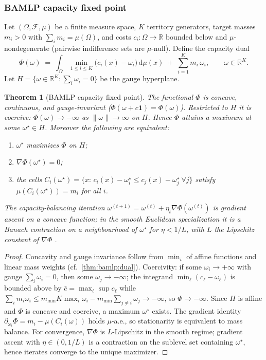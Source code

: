 \documentclass[11pt]{article}
\theoremstyle{plain}
\newtheorem{theorem}{Theorem}[section]
\theoremstyle{definition}
\theoremstyle{remark}
\newcommand{\dd}{\mathrm{d}}
\begin{document}
\subsubsection{BAMLP capacity fixed point}

Let $(\Omega,\mathcal{F},\mu)$ be a finite measure space, $K$ territory
generators, target masses $m_i>0$ with $\sum_i m_i=\mu(\Omega)$, and costs
$c_i:\Omega\to\mathbb{R}$ bounded below and $\mu$-nondegenerate (pairwise
indifference sets are $\mu$-null). Define the capacity dual
\begin{equation}
  \Phi(\omega)\;=\;\int_\Omega \min_{1\le i\le K}\bigl(c_i(x)-\omega_i\bigr)\,\dd\mu(x)
  \;+\;\sum_{i=1}^{K} m_i\,\omega_i,
  \qquad \omega\in\mathbb{R}^K.
  \label{eq:bamlp:phi}
\end{equation}
Let $H=\{\omega\in\mathbb{R}^K:\sum_i\omega_i=0\}$ be the gauge hyperplane.

\begin{theorem}[BAMLP capacity fixed point]\label{thm:bamlp:capacity-fp}
The functional $\Phi$ is concave, continuous, and gauge-invariant
($\Phi(\omega+c\mathbf{1})=\Phi(\omega)$). Restricted to $H$ it is coercive:
$\Phi(\omega)\to-\infty$ as $\|\omega\|\to\infty$ on $H$. Hence $\Phi$
attains a maximum at some $\omega^\star\in H$. Moreover the following are
equivalent:
\begin{enumerate}[label=\textup{(\roman*)}]
  \item $\omega^\star$ maximizes $\Phi$ on $H$;
  \item $\nabla\Phi(\omega^\star)=0$;
  \item the cells $C_i(\omega^\star)=\{x:\,c_i(x)-\omega^\star_i\le
    c_j(x)-\omega^\star_j\ \forall j\}$ satisfy $\mu(C_i(\omega^\star))=m_i$
    for all $i$.
\end{enumerate}
The capacity-balancing iteration $\omega^{(t+1)}=\omega^{(t)}+\eta_t\nabla\Phi
(\omega^{(t)})$ is gradient ascent on a concave function; in the smooth
Euclidean specialization it is a Banach contraction on a neighbourhood of
$\omega^\star$ for $\eta<1/L$, with $L$ the Lipschitz constant of $\nabla\Phi$
\cite{BAMLP:2026}.
\end{theorem}

\begin{proof}
Concavity and gauge invariance follow from $\min_i$ of affine functions and
linear mass weights (cf.\ \autoref{thm:bamlp:dual}). Coercivity: if some
$\omega_i\to+\infty$ with gauge $\sum_i\omega_i=0$, then some $\omega_j\to
-\infty$; the integrand $\min_\ell(c_\ell-\omega_\ell)$ is bounded above by
$\bar c=\max_\ell\sup c_\ell$ while $\sum_i m_i\omega_i\le m_{\min} K
\max_i\omega_i - m_{\min}\sum_{j\ne i}\omega_j\to-\infty$, so $\Phi\to-\infty$.
Since $H$ is affine and $\Phi$ is concave and coercive, a maximum $\omega^\star$
exists. The gradient identity
$\partial_{\omega_i}\Phi=m_i-\mu(C_i(\omega))$ holds $\mu$-a.e., so
stationarity is equivalent to mass balance. For convergence, $\nabla\Phi$ is
$L$-Lipschitz in the smooth regime; gradient ascent with $\eta\in(0,1/L)$ is a
contraction on the sublevel set containing $\omega^\star$, hence iterates
converge to the unique maximizer.
\end{proof}
\end{document}
